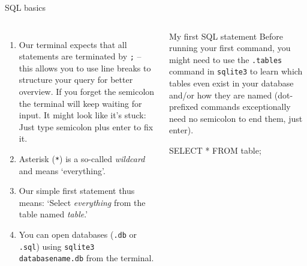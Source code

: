 \begin{frame}[fragile]{SQL basics}
\begin{columns}
  \begin{enumerate}\footnotesize
      \item Our terminal expects that all statements are terminated by \texttt{;} -- this allows you to use line breaks to structure your query for better overview. If you forget the semicolon the terminal will keep waiting for input. It might look like it's stuck: Just type semicolon plus enter to fix it. 
      \item Asterisk (\texttt{*}) is a so-called \emph{wildcard} and means `everything'.
      \item Our simple first statement thus means: `Select \emph{everything} from the table named \emph{table}.'
      \item You can open databases (\texttt{.db} or \texttt{.sql}) using \texttt{sqlite3 databasename.db} from the terminal.
  \end{enumerate}
    \begin{block}{My first SQL statement}
    \footnotesize
    Before running your first command, you might need to use the \texttt{.tables} command in \texttt{sqlite3} to learn which tables even exist in your database and/or how they are named  (dot-prefixed commands exceptionally need no semicolon to end them, just enter).
    \begin{sqlcode}
    SELECT * FROM table;
    \end{sqlcode}
\end{block}

\end{columns}
\end{frame}


